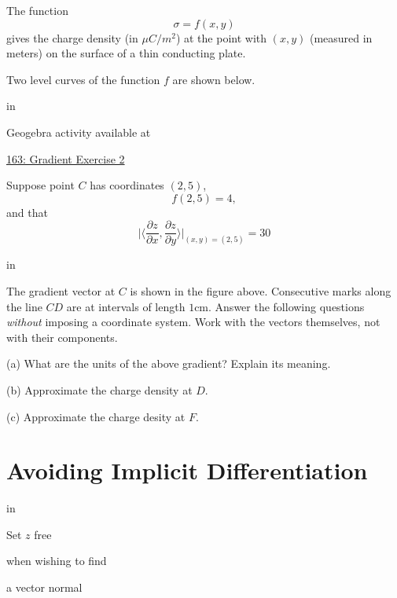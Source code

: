 \documentclass{ximera}
\newcommand{\pskip}{\vskip 0.1 in}
\begin{document}
\begin{question} \label{Q34gvbty}
The function 
\[
 \sigma = f(x,y)
\]
gives the charge density (in $\mu C/m^2$) at the point with $(x,y)$ (measured in meters) on the surface of a thin conducting plate.

Two level curves of the function $f$ are shown below.

\pskip

 
\begin{onlineOnly}
    \begin{center}
\end{center}
\end{onlineOnly}

Geogebra activity available at

\href{https://www.geogebra.org/classic/xnqmhyvd}{163: Gradient Exercise 2}


Suppose point $C$ has coordinates $(2,5)$,
\[
    f(2,5) = 4,
\]
and that
\[
    \Big|  \langle \frac{\partial z}{\partial x}, \frac{\partial z}{\partial y} \rangle \Big|_{(x,y) =(2,5)} = 30
\]

\pskip

The gradient vector at $C$ is shown in the figure above. Consecutive marks along the line $CD$ are at intervals of length $1$cm. Answer the following questions \emph{without} imposing a coordinate system. Work with the vectors themselves, not with their components.

(a) What are the units of the above gradient? Explain its meaning.

(b) Approximate the charge density at $D$.

(c) Approximate the charge desity at $F$.



\end{question}


\section{Avoiding Implicit Differentiation}

\pskip

Set $z$ free

when wishing to find

a vector normal
\end{document}
